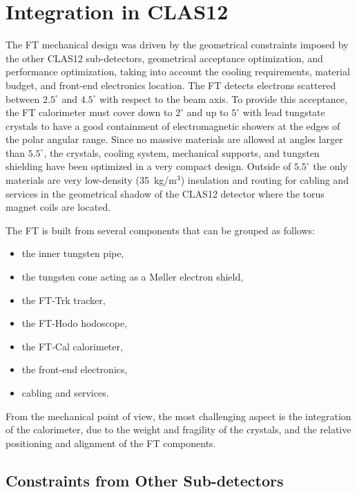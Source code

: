 \section{Integration in CLAS12}
\label{sec:integration}

The FT mechanical design was driven by the geometrical constraints imposed by the other CLAS12 sub-detectors,
geometrical acceptance optimization, and performance optimization, taking into account the cooling requirements,
material budget, and front-end electronics location. The FT detects electrons scattered between $2.5^\circ$ and
$4.5^\circ$ with respect to the beam axis. To provide this acceptance, the FT calorimeter must cover down to
$2^\circ$ and up to $5^\circ$ with lead tungstate crystals to have a good containment of electromagnetic showers at
the edges of the polar angular range. Since no massive materials are allowed at angles larger than $5.5^\circ$, the
crystals, cooling system, mechanical supports, and tungsten shielding have been optimized in a very compact design.
Outside of $5.5^\circ$ the only materials are very low-density (35~kg/m$^3$) insulation and routing for cabling and
services in the geometrical shadow of the CLAS12 detector where the torus magnet coils are located.

The FT is built from several components that can be grouped as follows:

\begin{itemize}
\item{the inner tungsten pipe,}
\item{the tungsten cone acting as a M{\o}ller electron shield,}
\item{the FT-Trk tracker,}
\item{the FT-Hodo hodoscope,}
\item{the FT-Cal calorimeter,}
\item{the front-end electronics,}
\item{cabling and services.}
\end{itemize}

From the mechanical point of view, the most challenging aspect is the integration of the calorimeter, due to the
weight and fragility of the crystals, and the relative positioning and alignment of the FT components.

\subsection{Constraints from Other Sub-detectors}

